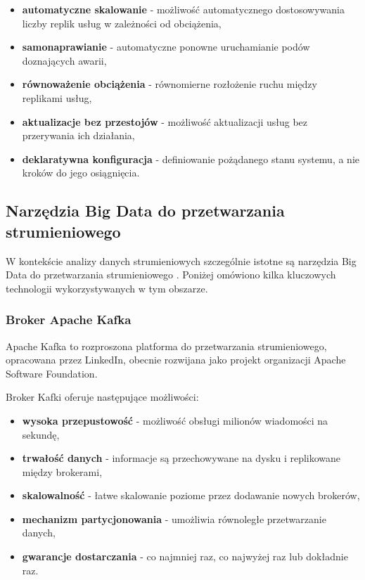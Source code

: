 \begin{itemize}
    \item \textbf{automatyczne skalowanie} - możliwość automatycznego dostosowywania liczby replik usług w zależności od obciążenia,
    \item \textbf{samonaprawianie} - automatyczne ponowne uruchamianie podów doznających awarii,
    \item \textbf{równoważenie obciążenia} - równomierne rozłożenie ruchu między replikami usług,
    \item \textbf{aktualizacje bez przestojów} - możliwość aktualizacji usług bez przerywania ich działania,
    \item \textbf{deklaratywna konfiguracja} - definiowanie pożądanego stanu systemu, a nie kroków do jego osiągnięcia.
\end{itemize}

\subsection{Narzędzia Big Data do przetwarzania strumieniowego}
\label{subsec:narzedzia_big_data}

W kontekście analizy danych strumieniowych szczególnie istotne są narzędzia Big Data do przetwarzania strumieniowego \cite{spark_streaming}.
Poniżej omówiono kilka kluczowych technologii wykorzystywanych w tym obszarze.

\subsubsection{Broker Apache Kafka}
\label{subsubsec:apache_kafka}

Apache Kafka \cite{kafka} to rozproszona platforma do przetwarzania strumieniowego, opracowana przez LinkedIn, obecnie rozwijana jako projekt
organizacji Apache Software Foundation. 

\vspace{0.3em}

Broker Kafki oferuje następujące możliwości:

\begin{itemize}
    \item \textbf{wysoka przepustowość} - możliwość obsługi milionów wiadomości na sekundę,
    \item \textbf{trwałość danych} - informacje są przechowywane na dysku i replikowane między brokerami,
    \item \textbf{skalowalność} - łatwe skalowanie poziome przez dodawanie nowych brokerów,
    \item \textbf{mechanizm partycjonowania} - umożliwia równoległe przetwarzanie danych,
    \item \textbf{gwarancje dostarczania} - co najmniej raz, co najwyżej raz lub dokładnie raz.
\end{itemize}

